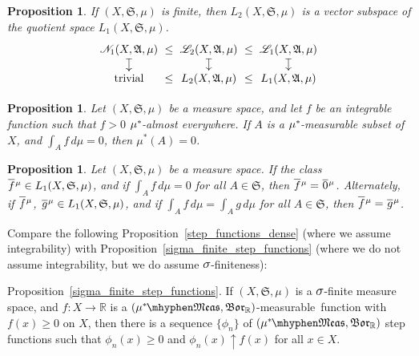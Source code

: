 \documentclass[
twoside=true,
paper=letter,
fontsize=11pt,
pagesize=auto,
leqno,
openany,
headsepline,
overfullrule,
]{scrbook}
\theoremstyle{plain}
\theoremstyle{plain}
\newtheorem{prop}[thm]{Proposition}
\theoremstyle{definition}
\theoremstyle{bfnoteitalic}
\theoremstyle{bfnoteroman}
\newcommand{\sigalg}[1]{\mathfrak{#1}}
\newcommand{\cali}[1]{\mathscr{#1}}
\newcommand{\borel}{\mathfrak{Bor}}
\newcommand{\textsigma}{\hbox{\large{$\sigma$}}\kern-1pt}
\newcommand{\R}{\mathbb{R}}
\newcommand{\semiring}{\sigalg{S}}
\newcommand{\sigmaalgebra}{\sigalg{A}}
\newcommand{\measurable}[1]{{#1}\mhyphen\mathfrak{Meas}}
\newcommand{\kernast}{\ast\kern-1pt}
\newcommand{\mbmeasurable}{$(\measurable{\measure^\kernast},\borel_\R)$\hyp{}measurable}
\newcommand{\measurespace}{X}
\newcommand{\measure}{\mu}
\newcommand*\xbar[1]{%
   \hbox{%
     \vbox{%
       \hrule height 0.4pt %
       \kern0.4ex%
       \hbox{%
         \ensuremath{#1}%
       }%
     }%
   }%
}
\newcommand{\lebclass}[1]{\hspace{.5pt}\xbar{#1}\hspace{0.5pt}}
\newcommand{\ellclass}[2]{\lebclass{#1}^{#2}}
\begin{document}
\begin{prop}
If $(\measurespace, \semiring, \measure)$ is finite, then $L_2(\measurespace, \semiring, \measure)$ is a vector subspace of the quotient space
$L_1(\measurespace, \semiring, \measure)$. 
\[
\xymatrix@R=10pt@C=0pt{ 
\cali{N}_1(\measurespace, \sigmaalgebra, \measure) \ar@{|->}[d] & \leq  & 
\cali{L}_2(\measurespace, \sigmaalgebra, \measure) \ar@{|->}[d] & \leq & 
\cali{L}_1(\measurespace, \sigmaalgebra, \measure) \ar@{|->}[d]\\
\text{trivial} & \leq & 
L_2(\measurespace, \sigmaalgebra, \measure) & \leq &
L_1(\measurespace, \sigmaalgebra, \measure)\\
}
\]
\end{prop}






\begin{prop}\label{null_set_test}
Let $(\measurespace, \semiring, \measure)$ be a measure space, and let $f$ be an integrable function such that $f>0$ $\measure^\kernast$-almost everywhere.  If 
$A$ is a $\measure^\kernast$-measurable subset of $\measurespace$, and $\int_A f\, d\measure=0$, then $\measure^*(A)=0$.
\end{prop}



\begin{prop}\label{equal_function_test}
Let $(\measurespace, \semiring, \measure)$ be a measure space. If the class
$\ellclass{f}{\measure}\in L_1 (\measurespace, \semiring, \measure)$, and if  $\int_A f\, d\measure =0$ for all $A\in \semiring$, then $\ellclass{f}{\measure} = \ellclass{0}{\measure}$. Alternately,  if
$\ellclass{f}{\measure}$, $\ellclass{g}{\measure} \in L_1 (\measurespace, \semiring, \measure)$, and if 
$\int_A f\, d\measure = \int_A g\, d\measure$ for all $A\in \semiring$, then 
$\ellclass{f}{\measure} = \ellclass{g}{\measure}$.
\end{prop}



Compare the following Proposition~\ref{step_functions_dense} (where we assume integrability) with Proposition~\ref{sigma_finite_step_functions} (where we do not assume integrability, but we do assume 
$\textsigma$-finiteness):
\begin{quoting}
\small
Proposition~\ref{sigma_finite_step_functions}.
If $(\measurespace, \semiring, \measure)$ is a $\textsigma$-finite measure space, and $f:\measurespace\to\R$ is a \mbmeasurable\ function with $f(x)\geq 0$ on $\measurespace$, 
then there is a sequence $\{\phi_n\}$ of $(\measurable{\measure^\kernast},\borel_\R)$ step functions such that $\phi_n(x)\geq 0$ and $\phi_n(x)\uparrow f(x)$ for all $x\in\measurespace$.
\end{quoting}
\end{document}
